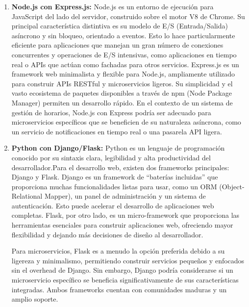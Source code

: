 \begin{enumerate}
    \item \textbf{Node.js con Express.js\cite{expressjs}:}
    Node.js es un entorno de ejecución para JavaScript del lado del servidor, construido sobre el motor V8 de Chrome. Su principal característica distintiva es su modelo de E/S (Entrada/Salida) asíncrono y sin bloqueo, orientado a eventos. Esto lo hace particularmente eficiente para aplicaciones que manejan un gran número de conexiones concurrentes y operaciones de E/S intensivas, como aplicaciones en tiempo real o APIs que actúan como fachadas para otros servicios. Express.js es un framework web minimalista y flexible para Node.js, ampliamente utilizado para construir APIs RESTful y microservicios ligeros. Su simplicidad y el vasto ecosistema de paquetes disponibles a través de npm (Node Package Manager) permiten un desarrollo rápido. En el contexto de un sistema de gestión de horarios, Node.js con Express podría ser adecuado para microservicios específicos que se beneficien de su naturaleza asíncrona, como un servicio de notificaciones en tiempo real o una pasarela API ligera.

    \item \textbf{Python con Django/Flask\cite{djangobook}\cite{flask}:}
    Python es un lenguaje de programación conocido por su sintaxis clara, legibilidad y alta productividad del desarrollador.Para el desarrollo web, existen dos frameworks principales: Django y Flask. Django es un framework de ``baterías incluidas'' que proporciona muchas funcionalidades listas para usar, como un ORM (Object-Relational Mapper), un panel de administración y un sistema de autenticación. Esto puede acelerar el desarrollo de aplicaciones web completas. Flask, por otro lado, es un micro-framework que proporciona las herramientas esenciales para construir aplicaciones web, ofreciendo mayor flexibilidad y dejando más decisiones de diseño al desarrollador.

    Para microservicios, Flask es a menudo la opción preferida debido a su ligereza y minimalismo, permitiendo construir servicios pequeños y enfocados sin el overhead de Django. Sin embargo, Django podría considerarse si un microservicio específico se beneficia significativamente de sus características integradas. Ambos frameworks cuentan con comunidades maduras y un amplio soporte.


\end{enumerate}
